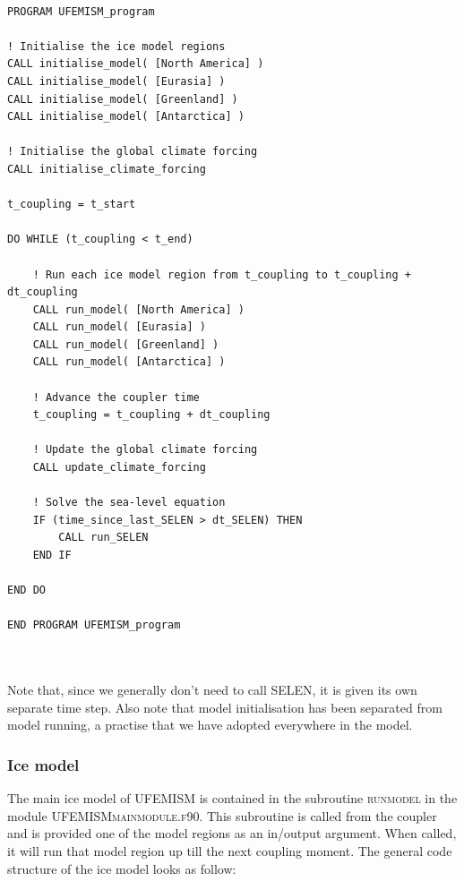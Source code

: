 \documentclass{article}
\begin{document}
\hrulefill
\begin{lstlisting}

PROGRAM UFEMISM_program

! Initialise the ice model regions
CALL initialise_model( [North America] )
CALL initialise_model( [Eurasia] )
CALL initialise_model( [Greenland] )
CALL initialise_model( [Antarctica] )

! Initialise the global climate forcing
CALL initialise_climate_forcing

t_coupling = t_start

DO WHILE (t_coupling < t_end)
	
	! Run each ice model region from t_coupling to t_coupling + dt_coupling
	CALL run_model( [North America] )
	CALL run_model( [Eurasia] )
	CALL run_model( [Greenland] )
	CALL run_model( [Antarctica] )
	
	! Advance the coupler time
	t_coupling = t_coupling + dt_coupling
	
	! Update the global climate forcing
	CALL update_climate_forcing
	
	! Solve the sea-level equation
	IF (time_since_last_SELEN > dt_SELEN) THEN
		CALL run_SELEN
	END IF
	
END DO

END PROGRAM UFEMISM_program

\end{lstlisting}
\hrulefill
\\
\\

Note that, since we generally don't need to call SELEN, it is given its own separate time step. Also note that model initialisation has been separated from model running, a practise that we have adopted everywhere in the model.

\subsubsection{Ice model}

The main ice model of UFEMISM is contained in the subroutine \textsc{run\textunderscore model} in the module \textsc{UFEMISM\textunderscore main\textunderscore module.f90}. This subroutine is called from the coupler and is provided one of the model regions as an in/output argument. When called, it will run that model region up till the next coupling moment. The general code structure of the ice model looks as follow:
\end{document}
